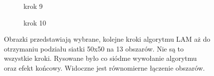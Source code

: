 \begin{figure}[h]
\begin{subfigure}{.5\textwidth}
    \centering
    \caption[short]{krok 9}
\end{subfigure}
\begin{subfigure}{.5\textwidth}
    \centering
    \caption[short]{krok 10}
\end{subfigure}
\caption{Obrazki przedstawiają wybrane, kolejne kroki algorytmu LAM aż do otrzymaniu podziału siatki 50x50 na 13 obszarów.
Nie są to wszystkie kroki. Rysowane było co
siódme wywołanie algorytmu oraz efekt końcowy. Widoczne jest równomierne łączenie obszarów.}
\label{im:lam_steps}
\end{figure}
\FloatBarrier